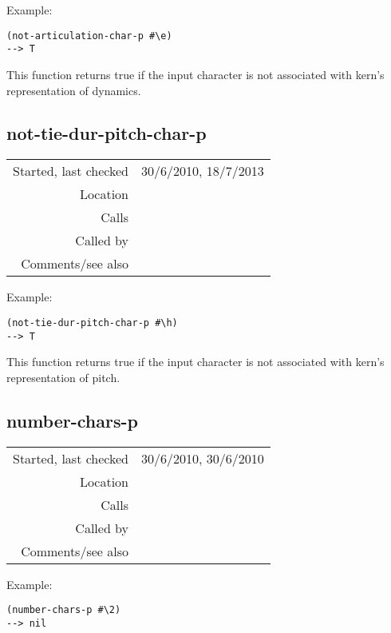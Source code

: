 \vspace{0.5cm}
\noindent Example:
\begin{verbatim}
(not-articulation-char-p #\e)
--> T
\end{verbatim}

\noindent This function returns true if the input
character is not associated with kern's representation
of dynamics.


\subsection*{not-tie-dur-pitch-char-p}\label{fun:not-tie-dur-pitch-char-p}

\vspace{0.3cm}
\begin{tabular}{r|p{8cm}}
Started, last checked & 30/6/2010, 18/7/2013 \\
Location & \nameref{sec:kern} \\
Calls & \\
Called by & \nameref{fun:parse-kern-row} \\
Comments/see also &
\end{tabular}

\vspace{0.5cm}
\noindent Example:
\begin{verbatim}
(not-tie-dur-pitch-char-p #\h)
--> T
\end{verbatim}

\noindent This function returns true if the input
character is not associated with kern's representation
of pitch.


\subsection*{number-chars-p}\label{fun:number-chars-p}

\vspace{0.3cm}
\begin{tabular}{r|p{8cm}}
Started, last checked & 30/6/2010, 30/6/2010 \\
Location & \nameref{sec:kern} \\
Calls & \\
Called by & \nameref{fun:kern-tie-dur-pitch2list} \\
Comments/see also &
\end{tabular}

\vspace{0.5cm}
\noindent Example:
\begin{verbatim}
(number-chars-p #\2)
--> nil
\end{verbatim}

